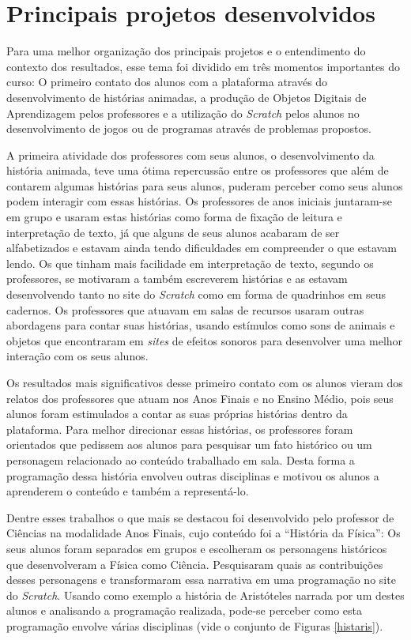 \documentclass[12pt, openright, a4paper, brazil, english, french, spanish, bibjustif, openany, oneside]{abntex2}
\begin{document}
\section{Principais projetos desenvolvidos}

Para uma melhor organização dos principais projetos e o entendimento do contexto dos resultados, esse tema foi dividido em três momentos importantes do curso: O primeiro contato dos alunos com a plataforma através do desenvolvimento de histórias animadas, a produção de Objetos Digitais de Aprendizagem pelos professores e a utilização do \textit{Scratch} pelos alunos no desenvolvimento de jogos ou de programas através de problemas propostos.

A primeira atividade dos professores com seus alunos, o desenvolvimento da história animada, teve uma ótima repercussão entre os professores que além de contarem algumas histórias para seus alunos, puderam perceber como seus alunos podem interagir com essas histórias. Os professores de anos iniciais juntaram-se em grupo e usaram estas histórias como forma de fixação de leitura e interpretação de texto, já que alguns de seus alunos acabaram de ser alfabetizados e estavam ainda tendo dificuldades em compreender o que estavam lendo. Os que tinham mais facilidade em interpretação de texto, segundo os professores, se motivaram a também escreverem histórias e as estavam desenvolvendo tanto no site do \textit{Scratch} como em forma de quadrinhos em seus cadernos. Os professores que atuavam em salas de recursos usaram outras abordagens para contar suas histórias, usando estímulos como sons de animais e objetos que encontraram em \textit{sites} de efeitos sonoros para desenvolver uma melhor interação com os seus alunos.

Os resultados mais significativos desse primeiro contato com os alunos vieram dos relatos dos professores que atuam nos Anos Finais e no Ensino Médio, pois seus alunos foram estimulados a contar as suas próprias histórias dentro da plataforma. Para melhor direcionar essas histórias, os professores foram orientados que pedissem aos alunos para pesquisar um fato histórico ou um personagem relacionado ao conteúdo trabalhado em sala. Desta forma a programação dessa história envolveu outras disciplinas e motivou os alunos a aprenderem o conteúdo e também a representá-lo. 

Dentre esses trabalhos o que mais se destacou foi desenvolvido pelo professor de Ciências na modalidade Anos Finais, cujo conteúdo foi a ``História da Física'': Os seus alunos foram separados em grupos e escolheram os personagens históricos que desenvolveram a Física como Ciência. Pesquisaram quais as contribuições desses personagens e transformaram essa narrativa em uma programação no site do \textit{Scratch}. Usando como exemplo a história de Aristóteles narrada por um destes alunos e analisando a programação realizada, pode-se perceber como esta programação envolve várias disciplinas (vide o conjunto de Figuras \ref{histaris}).
\end{document}
